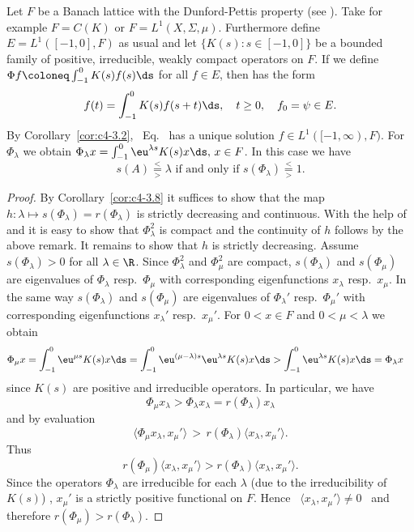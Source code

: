 \begin{example}\label{ex:c4-3.10}
%
Let $F$ be a Banach lattice with the Dunford-Pettis property (see \textcite[Section II.9]{schaefer:1974}).
Take for example $F = C(K)$ or $F = L^{1}(X, \Sigma, \mu)$.
Furthermore define $E = L^{1}([-1,0],F)$ as usual and let $\{K(s) \colon s \in [-1,0]\}$ be a bounded family of positive, irreducible, weakly compact operators on $F$.
If we define $\Phi f \coloneq \int_{-1}^{0} K(s)f(s) \ds$ for all $f \in E$, then 
has the form
\begin{equation}\label{eq:c4-3.11}
f(t) = \int_{-1}^{0} K(s)f(s+t) \ds  , \quad t \geq 0  ,\quad f_{0} = \psi \in E .
\end{equation}
By Corollary~\ref{cor:c4-3.2}, \ Eq.~ has a unique solution $f \in L^{1}([-1,\infty),F)$.
For $\Phi_{\lambda}$ we obtain $\Phi_{\lambda}x = \int_{-1}^{0} \eu^{\lambda s}K(s)x \ds,\, x \in F$.
In this case we have 
\[
\text{$s(A) \overset{<}{ \underset{>}{=} } \lambda$  if and only if 
$s(\Phi_{\lambda}) \overset{<}{ \underset{>}{=} } 1$.}
\]
\end{example}
\begin{proof}
By Corollary~\ref{cor:c4-3.8} it suffices to show that the map $h \colon \lambda \mapsto s(\Phi_{\lambda}) = r(\Phi_{\lambda})$ is strictly decreasing and continuous.
With the help of \textcite[Theorem III.11.4]{schaefer:1966} and \textcite[Theorem II.9.9]{schaefer:1974} it is easy to show that $\Phi_{\lambda}^{2}$ is compact and the continuity of\/ $h$ follows by the above remark.
It remains to show that $h$ is strictly decreasing.
Assume $s(\Phi_{\lambda}) > 0$ for all $\lambda \in \R$.
Since $\Phi_{\lambda}^{2}$ and $\Phi_{\mu}^{2}$ are compact, 
$s(\Phi_{\lambda})$ and $s(\Phi_{\mu})$ are eigenvalues of\/ $\Phi_{\lambda}$ resp.\ $\Phi_{\mu}$ with corresponding eigenfunctions $x_{\lambda}$ resp.\ $x_{\mu}$.
In the same way $s(\Phi_{\lambda})$ and $s(\Phi_{\mu})$ are eigenvalues of\/ $\Phi_{\lambda}'$ resp.\ $\Phi_{\mu}'$ with corresponding eigenfunctions $x_{\lambda}'$ resp.\ $x_{\mu}'$.
For $0 < x \in F$ and $0 < \mu < \lambda$ we obtain
\begin{align*}
\Phi_{\mu}x &= \int_{-1}^{0} \eu^{\mu s}K(s)x \ds = \int_{-1}^{0} \eu^{(\mu-\lambda) s}\eu^{\lambda s}K(s)x \ds > \int_{-1}^{0} \eu^{\lambda s}K(s)x \ds = \Phi_{\lambda}x
\end{align*}
since $K(s)$ are positive and irreducible operators.
In particular, we have 
%
\[
	\Phi_{\mu}x_{\lambda} > \Phi_{\lambda}x_{\lambda} = r(\Phi_{\lambda})x_{\lambda}
\]
%
and by evaluation %
\[
	\langle\Phi_{\mu}x_{\lambda},x_{\mu}'\rangle \,>\, r(\Phi_{\lambda})\langle x_{\lambda},x_{\mu}'\rangle .
\]
%
Thus %
\[
	r(\Phi_{\mu})\langle x_{\lambda},x_{\mu}'\rangle > r(\Phi_{\lambda})\langle x_{\lambda},x_{\mu}'\rangle .
\]
%
Since the operators $\Phi_{\lambda}$ are irreducible for each $\lambda$ (due to the irreducibility of\/ $K(s)$) , $x_{\mu}'$ is a strictly positive functional on $F$.
Hence \ $\langle x_{\lambda},x_{\mu}'\rangle \neq 0$ \ and therefore
$r(\Phi_{\mu}) > r(\Phi_{\lambda})$.
\end{proof}

